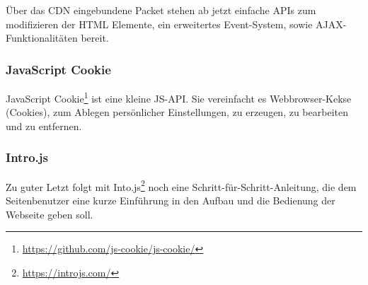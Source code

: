 Über das \ac{CDN} eingebundene Packet stehen ab jetzt einfache \aclp{API} zum modifizieren der \acs{HTML} Elemente, ein erweitertes Event-System, sowie \acs{AJAX}-Funktionalitäten bereit.

\subsubsection{JavaScript Cookie}
JavaScript Cookie\footnote{\url{https://github.com/js-cookie/js-cookie/}} ist eine kleine \acl{JS}-\ac{API}.
Sie vereinfacht es Webbrowser-Kekse (Cookies), zum Ablegen persönlicher Einstellungen, zu erzeugen, zu bearbeiten und zu entfernen.

\subsubsection{Intro.js}
Zu guter Letzt folgt mit Into.js\footnote{\url{https://introjs.com/}} noch eine Schritt-für-Schritt-Anleitung, die dem Seitenbenutzer eine kurze Einführung in den Aufbau und die Bedienung der Webseite geben soll.
